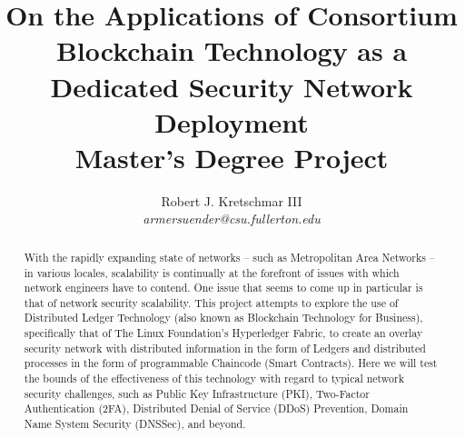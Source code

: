 \documentclass[12pt]{article}
\title{\bf{On the Applications of Consortium Blockchain Technology as a Dedicated Security Network Deployment\\
	\Large{Master's Degree Project}
	}}
\author{Robert J. Kretschmar III\\
	\textit{armersuender@csu.fullerton.edu}
	}
\affil{California State University, Fullerton}
\date{}
\begin{document}
	\maketitle
	\begin{abstract}
		With the rapidly expanding state of networks -- such as Metropolitan Area Networks -- in various locales, scalability is continually at the forefront of issues with which network engineers have to contend. One issue that seems to come up in particular is that of network security scalability. This project attempts to explore the use of Distributed Ledger Technology (also known as Blockchain Technology for Business), specifically that of The Linux Foundation's Hyperledger Fabric, to create an overlay security network with distributed information in the form of Ledgers and distributed processes in the form of programmable Chaincode (Smart Contracts). Here we will test the bounds of the effectiveness of this technology with regard to typical network security challenges, such as Public Key Infrastructure (PKI), Two-Factor Authentication (2FA), Distributed Denial of Service (DDoS) Prevention, Domain Name System Security (DNSSec), and beyond.
	\end{abstract}
	\newpage
	\tableofcontents
	
	
	
	
	
	
	
	
	
	
	
	
	
\end{document}
